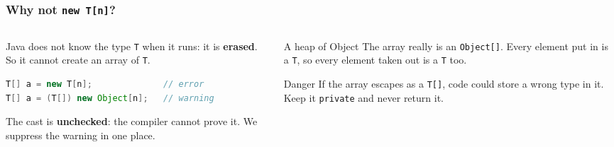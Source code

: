 \documentclass[aspectratio=169,10pt,compress]{beamer}
\begin{document}




\begin{frame}[t,fragile] \frametitle{Why not \texttt{new T[n]}?}
  \begin{columns}[T]
    \begin{column}{0.5\textwidth}
      \small Java does not know the type \texttt{T} when it runs: it is \textbf{erased}. So it cannot create an array of \texttt{T}.


\begin{lstlisting}[style=codesnippet, language=Java, basicstyle=\ttfamily\scriptsize]
T[] a = new T[n];              // error
T[] a = (T[]) new Object[n];   // warning
\end{lstlisting}


      \vspace{0.3em}
      \small The cast is \textbf{unchecked}: the compiler cannot prove it. We suppress the warning in one place.
    \end{column}
    \begin{column}{0.46\textwidth}
      \begin{block}{A heap of Object}
        \small The array really is an \texttt{Object[]}. Every element put in is a \texttt{T}, so every element taken out is a \texttt{T} too.
      \end{block}
      \begin{block}{Danger}
        \small If the array escapes as a \texttt{T[]}, code could store a wrong type in it. Keep it \texttt{private} and never return it.
      \end{block}
    \end{column}
  \end{columns}
\end{frame}
\end{document}
